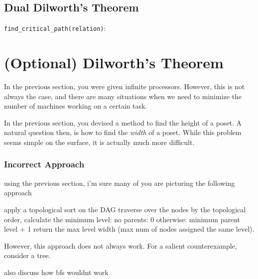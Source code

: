 \documentclass{article}
\begin{document}
    \subsection*{Dual Dilworth's Theorem}


    \begin{tcolorbox}[colback=blue!10]
        \lstinline{find_critical_path(relation)}: 
    \end{tcolorbox}






\section*{(Optional) Dilworth's Theorem}
        In the previous section, you were given infinite processors. However, this is not always the case, and there are many situations when we need to minimize the number of machines working on a certain task.

    
        In the previous section, you devised a method to find the height of a poset. A natural question then, is how to find the \textit{width} of a poset. While this problem seems simple on the surface, it is actually much more difficult. 
        
    \subsubsection*{Incorrect Approach}

    using the previous section, i'm sure many of you are picturing the following approach
    
    apply a topological sort on the DAG
    traverse over the nodes by the topological order, calculate the minimum level:
    no parents: 0
    otherwise: minimum parent level + 1
    return the max level width (max num of nodes assigned the same level).

    However, this approach does not always work. For a salient counterexample, consider a tree.

    also discuss how bfs wouldnt work

        
\end{document}
